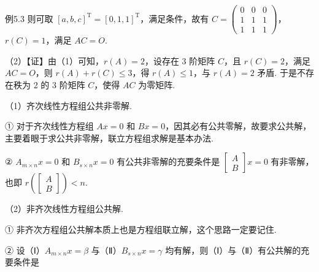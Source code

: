 \begin{fcard}{例5.3}
则可取 $[a,b,c]^{\mathrm T}=[0,1,1]^{\mathrm T}$，满足条件，故有 $C=\begin{pmatrix}0&0&0\\1&1&1\\1&1&1\end{pmatrix}$，$r(C)=1$，满足 $AC=O$.

（2）【证】由（1）可知，$r(A)=2$，设存在 3 阶矩阵 $C$，且 $r(C)=2$，满足 $AC=O$，则 $r(A)+r(C)\le3$，得 $r(A)\le1$，与 $r(A)=2$ 矛盾. 于是不存在秩为 2 的 3 阶矩阵 $C$，使得 $AC$ 为零矩阵.
\end{fcard}



（1）齐次线性方程组公共非零解.

① 对于齐次线性方程组 $Ax=0$ 和 $Bx=0$，因其必有公共零解，故要求公共解，主要着眼于求公共非零解，联立方程组求解是基本办法.

② $A_{m\times n}x=0$ 和 $B_{s\times n}x=0$ 有公共非零解的充要条件是 $\begin{bmatrix}A\\B\end{bmatrix}x=0$ 有非零解，也即 $r\left(\begin{bmatrix}A\\B\end{bmatrix}\right)<n$.

（2）非齐次线性方程组公共解.

① 非齐次方程组公共解本质上也是方程组联立解，这个思路一定要记住.

② 设（Ⅰ）$A_{m\times n}x=\beta$ 与（Ⅱ）$B_{s\times n}x=\gamma$ 均有解，则（Ⅰ）与（Ⅱ）有公共解的充要条件是


